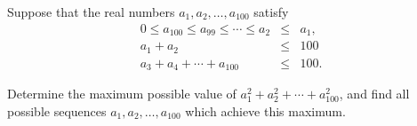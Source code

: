 Suppose that the real numbers $a_1, a_2, \ldots, a_{100}$ satisfy\begin{eqnarray*} 0 \leq a_{100} \leq a_{99} \leq \cdots \leq a_2 &\leq& a_1 , \\ a_1+a_2 & \leq & 100 \\ a_3+a_4+\cdots+a_{100} &\leq & 100. \end{eqnarray*}

Determine the maximum possible value of $a_1^2 + a_2^2 + \cdots + a_{100}^2$,  and find all possible sequences $a_1, a_2, \ldots , a_{100}$ which achieve this maximum.